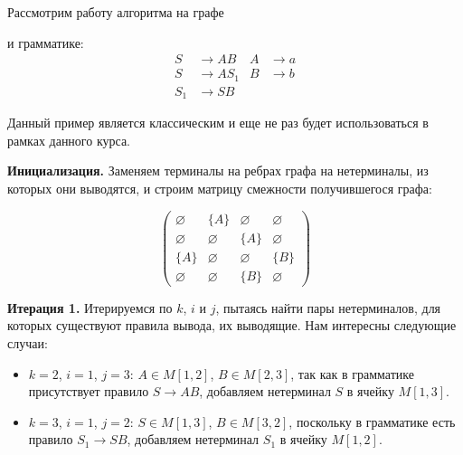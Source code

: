 \begin{example}
    \label{exmpl:CYKAlgorithm}
    Рассмотрим работу алгоритма на графе

    \begin{center}
        
    \end{center}

    и грамматике:
    \begin{align*}
        S   & \to A B   & A & \to a \\
        S   & \to A S_1 & B & \to b \\
        S_1 & \to S B   &   &
    \end{align*}

    Данный пример является классическим и еще не раз будет использоваться в рамках данного курса.

    \textbf{Инициализация.}
    Заменяем терминалы на ребрах графа на нетерминалы, из которых они выводятся, и строим матрицу смежности получившегося графа:

    \begin{center}
        
    \end{center}

    \[
        \begin{pmatrix}
            \varnothing & \{A\}       & \varnothing & \varnothing \\
            \varnothing & \varnothing & \{A\}       & \varnothing \\
            \{A\}       & \varnothing & \varnothing & \{B\}       \\
            \varnothing & \varnothing & \{B\}       & \varnothing
        \end{pmatrix}
    \]

    \textbf{Итерация 1.}
    Итерируемся по $k$, $i$ и $j$, пытаясь найти пары нетерминалов, для которых существуют правила вывода, их выводящие.
    Нам интересны следующие случаи:
    \begin{itemize}
        \item $k = 2$, $i = 1$, $j = 3$: $A \in M[1, 2]$, $B \in M[2, 3]$, так как в грамматике присутствует правило $S \to A B$, добавляем нетерминал $S$ в ячейку $M[1, 3]$.
        \item $k = 3$, $i = 1$, $j = 2$: $S \in M[1, 3]$, $B \in M[3, 2]$, поскольку в грамматике есть правило $S_1 \to S B$, добавляем нетерминал $S_1$ в ячейку $M[1, 2]$.
    \end{itemize}


\end{example}
